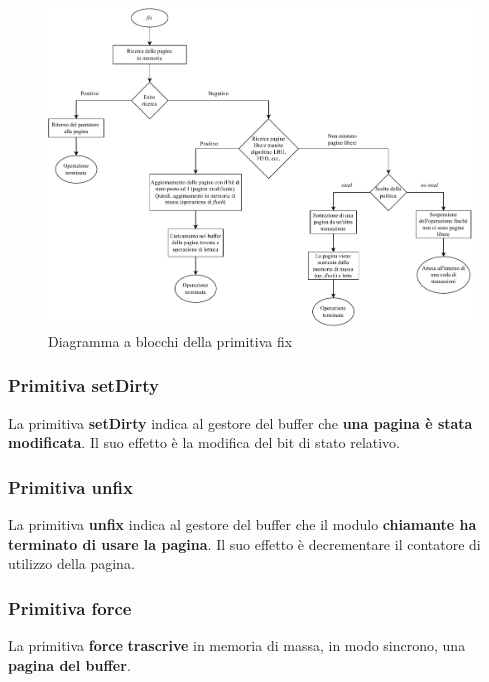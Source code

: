 \documentclass[a4paper]{article}
\begin{document}
	\begin{figure}[!htp]
		\centering
		\includegraphics[width=\textwidth]{img/gestione_del_buffer-fix.pdf}
		\caption{Diagramma a blocchi della primitiva fix}
	\end{figure}
	
	\subsubsection{Primitiva \textsf{setDirty}}
	
	La primitiva \textcolor{Red3}{\textbf{\textsf{setDirty}}} indica al gestore del buffer che \textbf{una pagina è stata modificata}. Il suo effetto è la modifica del bit di stato relativo.
	
	\subsubsection{Primitiva \textsf{unfix}}
	
	La primitiva \textcolor{Red3}{\textbf{\textsf{unfix}}} indica al gestore del buffer che il modulo \textbf{chiamante ha terminato di usare la pagina}. Il suo effetto è decrementare il contatore di utilizzo della pagina.
	
	\subsubsection{Primitiva \textsf{force}}
	
	La primitiva \textcolor{Red3}{\textbf{\textsf{force}}} \textbf{trascrive} in memoria di massa, in modo sincrono, una \textbf{pagina del buffer}.\newpage
	
\end{document}
